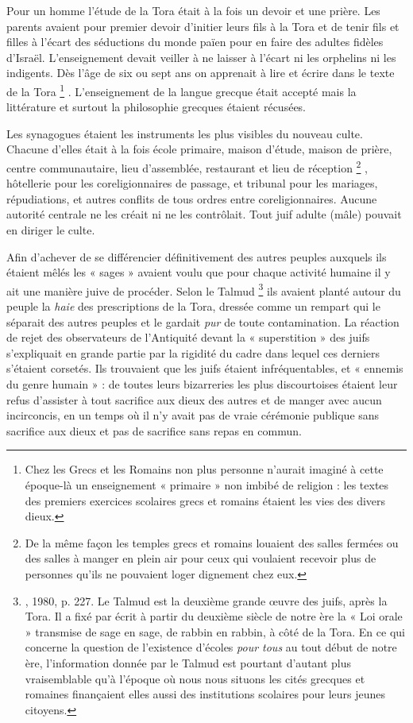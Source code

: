  Pour un homme l'étude de la Tora était à la fois un devoir et une prière. Les parents avaient pour premier devoir d'initier leurs fils à la Tora et de tenir fils et filles à l'écart des séductions du monde païen pour en faire des adultes fidèles d'Israël. L'enseignement devait veiller à ne laisser à l'écart ni les orphelins ni les indigents. Dès l'âge de six ou sept ans on apprenait à lire et écrire dans le texte de la Tora%
\footnote{Chez les Grecs et les Romains non plus personne n'aurait imaginé à cette époque-là un enseignement « primaire » non imbibé de religion : les textes des premiers exercices scolaires grecs et romains étaient les vies des divers dieux.}%
. L'enseignement de la langue grecque était accepté mais la littérature et surtout la philosophie grecques étaient récusées. 

 Les synagogues étaient les instruments les plus visibles du nouveau culte. Chacune d'elles était à la fois école primaire, maison d'étude, maison de prière, centre communautaire, lieu d'assemblée, restaurant et lieu de réception%
\footnote{De la même façon les temples grecs et romains louaient des salles fermées ou des salles à manger en plein air pour ceux qui voulaient recevoir plus de personnes qu'ils ne pouvaient loger dignement chez eux.}%
, hôtellerie pour les coreligionnaires de passage, et tribunal pour les mariages, répudiations, et autres conflits de tous ordres entre coreligionnaires. Aucune autorité centrale ne les créait ni ne les contrôlait. Tout juif adulte (mâle) pouvait en diriger le culte.

 Afin d'achever de se différencier définitivement des autres peuples auxquels ils étaient mêlés les « sages » avaient voulu que pour chaque activité humaine il y ait une manière juive de procéder. Selon le Talmud%
\footnote{, 1980, p. 227. Le Talmud est la deuxième grande œuvre des juifs, après la Tora. Il a fixé par écrit à partir du deuxième siècle de notre ère la « Loi orale » transmise de sage en sage, de rabbin en rabbin, à côté de la Tora. En ce qui concerne la question de l'existence d'écoles \emph{pour tous} au tout début de notre ère, l'information donnée par le Talmud est pourtant d'autant plus vraisemblable qu'à l'époque où nous nous situons les cités grecques et romaines finançaient elles aussi des institutions scolaires pour leurs jeunes citoyens.}
ils avaient planté autour du peuple la \emph{haie} des prescriptions de la Tora, dressée comme un rempart qui le séparait des autres peuples et le gardait \emph{pur} de toute contamination. La réaction de rejet des observateurs de l'Antiquité devant la « superstition » des juifs s'expliquait en grande partie par la rigidité du cadre dans lequel ces derniers s'étaient corsetés. Ils trouvaient que les juifs étaient infréquentables, et « ennemis du genre humain » : de toutes leurs bizarreries les plus discourtoises étaient leur refus d'assister à tout sacrifice aux dieux des autres et de manger avec aucun incirconcis, en un temps où il n'y avait pas de vraie cérémonie publique sans sacrifice aux dieux et pas de sacrifice sans repas en commun. 

